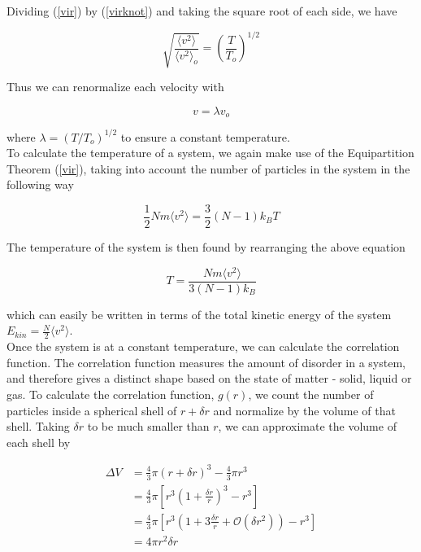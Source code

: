 \documentclass{article}
\begin{document}
\begin{multicols}{2}
Dividing (\ref{vir}) by (\ref{virknot}) and taking the square root of each side, we have

\begin{equation}
\sqrt{\frac{\langle v^2 \rangle}{\langle v^2 \rangle _o}} = \left ( \frac{T}{T_o} \right ) ^{1/2}
\end{equation}

\noindent Thus we can renormalize each velocity with 

\begin{equation}
v = \lambda v_o
\end{equation}

\noindent where $\lambda = (T/T_o)^{1/2}$ to ensure a constant temperature.  \\

To calculate the temperature of a system, we again make use of the Equipartition Theorem (\ref{vir}), taking into account the number of particles in the system in the following way

\begin{equation}
\frac{1}{2}N m \langle v^2 \rangle = \frac{3}{2} (N-1) k_B T
\end{equation}

\noindent The temperature of the system is then found by rearranging the above equation

\begin{equation}
T = \frac{Nm \langle v^2 \rangle}{3(N-1)k_B}
\end{equation}

\noindent which can easily be written in terms of the total kinetic energy of the system $E_{kin} = \frac{N}{2} \langle v^2 \rangle $.  \\

Once the system is at a constant temperature, we can calculate the correlation function.  The correlation function measures the amount of disorder in a system, and therefore gives a distinct shape based on the state of matter - solid, liquid or gas.  To calculate the correlation function, $g(r)$, we count the number of particles inside a spherical shell of $r + \delta r$ and normalize by the volume of that shell.  Taking $\delta r$ to be much smaller than $r$, we can approximate the volume of each shell by

\begin{equation}
\begin{split}
\Delta V & = \frac{4}{3} \pi (r+\delta r)^3 - \frac{4}{3} \pi r^3 \\
& = \frac{4}{3} \pi \left [ r^3 \left (1+\frac{\delta r}{r} \right )^3 - r^3 \right ] \\
& = \frac{4}{3} \pi \left [ r^3 \left ( 1 + 3\frac{\delta r}{r} + \mathcal{O} (\delta r ^2) \right ) - r^3 \right ] \\
& = 4 \pi r^2 \delta r
\end{split}
\end{equation}


\end{multicols}
\end{document}
